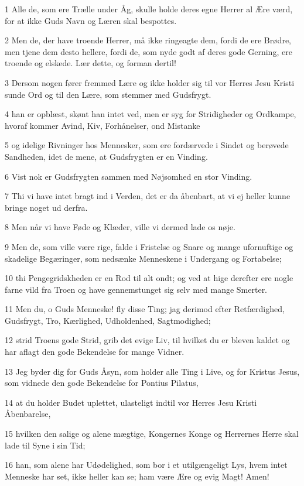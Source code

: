 \par 1 Alle de, som ere Trælle under Åg, skulle holde deres egne Herrer al Ære værd, for at ikke Guds Navn og Læren skal bespottes.
\par 2 Men de, der have troende Herrer, må ikke ringeagte dem, fordi de ere Brødre, men tjene dem desto hellere, fordi de, som nyde godt af deres gode Gerning, ere troende og elskede. Lær dette, og forman dertil!
\par 3 Dersom nogen fører fremmed Lære og ikke holder sig til vor Herres Jesu Kristi sunde Ord og til den Lære, som stemmer med Gudsfrygt.
\par 4 han er opblæst, skønt han intet ved, men er syg for Stridigheder og Ordkampe, hvoraf kommer Avind, Kiv, Forhånelser, ond Mistanke
\par 5 og idelige Rivninger hos Mennesker, som ere fordærvede i Sindet og berøvede Sandheden, idet de mene, at Gudsfrygten er en Vinding.
\par 6 Vist nok er Gudsfrygten sammen med Nøjsomhed en stor Vinding.
\par 7 Thi vi have intet bragt ind i Verden, det er da åbenbart, at vi ej heller kunne bringe noget ud derfra.
\par 8 Men når vi have Føde og Klæder, ville vi dermed lade os nøje.
\par 9 Men de, som ville være rige, falde i Fristelse og Snare og mange ufornuftige og skadelige Begæringer, som nedsænke Menneskene i Undergang og Fortabelse;
\par 10 thi Pengegridskheden er en Rod til alt ondt; og ved at hige derefter ere nogle farne vild fra Troen og have gennemstunget sig selv med mange Smerter.
\par 11 Men du, o Guds Menneske! fly disse Ting; jag derimod efter Retfærdighed, Gudsfrygt, Tro, Kærlighed, Udholdenhed, Sagtmodighed;
\par 12 strid Troens gode Strid, grib det evige Liv, til hvilket du er bleven kaldet og har aflagt den gode Bekendelse for mange Vidner.
\par 13 Jeg byder dig for Guds Åsyn, som holder alle Ting i Live, og for Kristus Jesus, som vidnede den gode Bekendelse for Pontius Pilatus,
\par 14 at du holder Budet uplettet, ulasteligt indtil vor Herres Jesu Kristi Åbenbarelse,
\par 15 hvilken den salige og alene mægtige, Kongernes Konge og Herrernes Herre skal lade til Syne i sin Tid;
\par 16 han, som alene har Udødelighed, som bor i et utilgængeligt Lys, hvem intet Menneske har set, ikke heller kan se; ham være Ære og evig Magt! Amen!
